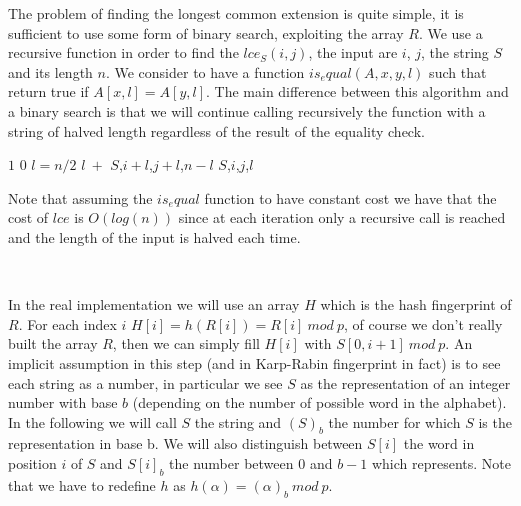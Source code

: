 \documentclass[a4paper]{article}
\begin{document}
\noindent
The problem of finding the longest common extension is quite simple, it is sufficient to use some form of binary search, exploiting the array $R$.
We use a recursive function in order to find the $lce_S(i, j)$, the input are $i$, $j$, the string $S$ and its length $n$.
We consider to have a function $is_equal(A, x, y, l)$ such that return true if $A[x, l] = A[y, l]$.
The main difference between this algorithm and a binary search is that we will continue calling recursively the function with a string of halved length regardless of the result of the equality check.
\begin{algorithmic}
		\State \Return $1$ 
	\Else 
		\State \Return $0$
	\EndIf
\EndIf
\State $l = n/2$
	\State \Return $l\ + $  {$S$,$i + l$,$j + l$,$n - l$}
\Else
	\State \Return {} {$S$,$i$,$j$,$l$}
\EndIf
\EndFunction
\end{algorithmic}
Note that assuming the $is_equal$ function to have constant cost we have that the cost of $lce$ is $O(log(n))$ since at each iteration only a recursive call is reached and the length of the input is halved each time.

\

\noindent
In the real implementation we will use an array $H$ which is the hash fingerprint of $R$.
For each index $i$ $H[i] = h(R[i]) = R[i]\ mod\ p$, of course we don't really built the array $R$, then we can simply fill $H[i]$ with $S[0,i+1]\ mod\ p$.
An implicit assumption in this step (and in Karp-Rabin fingerprint in fact) is to see each string as a number, in particular we see $S$ as the representation of an integer number with base $b$ (depending on the number of possible word in the alphabet).
In the following we will call $S$ the string and $(S)_b$ the number for which $S$ is the representation in base b.
We will also distinguish between $S[i]$ the word in position $i$ of $S$ and $S[i]_b$ the number between $0$ and $b-1$ which represents.
Note that we have to redefine $h$ as $h(\alpha) = (\alpha)_b\ mod\ p$.
\end{document}
